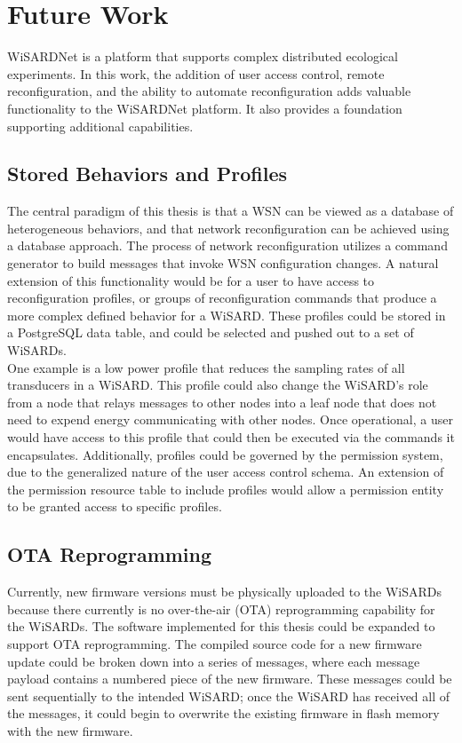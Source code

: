 \section{Future Work}
WiSARDNet is a platform that supports complex distributed ecological experiments. In this work, the addition of user access control, remote reconfiguration, and the ability to automate reconfiguration adds valuable functionality to the WiSARDNet platform. It also provides a foundation supporting additional capabilities. 

\subsection{Stored Behaviors and Profiles}
The central paradigm of this thesis is that a WSN can be viewed as a database of heterogeneous behaviors, and that network reconfiguration can be achieved using a database approach. The process of network reconfiguration utilizes a command generator to build messages that invoke WSN configuration changes. A natural extension of this functionality would be for a user to have access to reconfiguration profiles, or groups of reconfiguration commands that produce a more complex defined behavior for a WiSARD. These profiles could be stored in a PostgreSQL data table, and could be selected and pushed out to a set of WiSARDs.\\

One example is a low power profile that reduces the sampling rates of all transducers in a WiSARD. This profile could also change the WiSARD's role from a node that relays messages to other nodes into a leaf node that does not need to expend energy communicating with other nodes. Once operational, a user would have access to this profile that could then be executed via the commands it encapsulates. Additionally, profiles could be governed by the permission system, due to the generalized nature of the user access control schema. An extension of the permission resource table to include profiles would allow a permission entity to be granted access to specific profiles. 

\subsection{OTA Reprogramming}
Currently, new firmware versions must be physically uploaded to the WiSARDs because there currently is no over-the-air (OTA) reprogramming capability for the WiSARDs. The software implemented for this thesis could be expanded to support OTA reprogramming. The compiled source code for a new firmware update could be broken down into a series of messages, where each message payload contains a numbered piece of the new firmware. These messages could be sent sequentially to the intended WiSARD; once the WiSARD has received all of the messages, it could begin to overwrite the existing firmware in flash memory with the new firmware.\\

